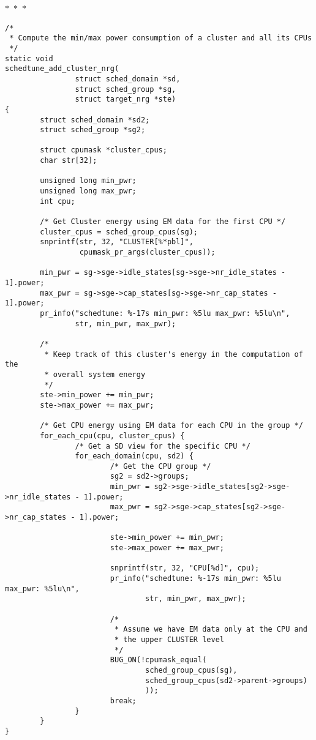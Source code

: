 \documentclass{article}
\newcommand{\divider}{{\begin{center}
  $\ast$~$\ast$~$\ast$
\end{center}}}
\begin{document}
\divider
\begin{verbatim}
/*
 * Compute the min/max power consumption of a cluster and all its CPUs
 */
static void
schedtune_add_cluster_nrg(
                struct sched_domain *sd,
                struct sched_group *sg,
                struct target_nrg *ste)
{
        struct sched_domain *sd2;
        struct sched_group *sg2;

        struct cpumask *cluster_cpus;
        char str[32];

        unsigned long min_pwr;
        unsigned long max_pwr;
        int cpu;

        /* Get Cluster energy using EM data for the first CPU */
        cluster_cpus = sched_group_cpus(sg);
        snprintf(str, 32, "CLUSTER[%*pbl]",
                 cpumask_pr_args(cluster_cpus));

        min_pwr = sg->sge->idle_states[sg->sge->nr_idle_states - 1].power;
        max_pwr = sg->sge->cap_states[sg->sge->nr_cap_states - 1].power;
        pr_info("schedtune: %-17s min_pwr: %5lu max_pwr: %5lu\n",
                str, min_pwr, max_pwr);

        /*
         * Keep track of this cluster's energy in the computation of the
         * overall system energy
         */
        ste->min_power += min_pwr;
        ste->max_power += max_pwr;

        /* Get CPU energy using EM data for each CPU in the group */
        for_each_cpu(cpu, cluster_cpus) {
                /* Get a SD view for the specific CPU */
                for_each_domain(cpu, sd2) {
                        /* Get the CPU group */
                        sg2 = sd2->groups;
                        min_pwr = sg2->sge->idle_states[sg2->sge->nr_idle_states - 1].power;
                        max_pwr = sg2->sge->cap_states[sg2->sge->nr_cap_states - 1].power;

                        ste->min_power += min_pwr;
                        ste->max_power += max_pwr;

                        snprintf(str, 32, "CPU[%d]", cpu);
                        pr_info("schedtune: %-17s min_pwr: %5lu max_pwr: %5lu\n",
                                str, min_pwr, max_pwr);

                        /*
                         * Assume we have EM data only at the CPU and
                         * the upper CLUSTER level
                         */
                        BUG_ON(!cpumask_equal(
                                sched_group_cpus(sg),
                                sched_group_cpus(sd2->parent->groups)
                                ));
                        break;
                }
        }
}
\end{verbatim}
\end{document}
